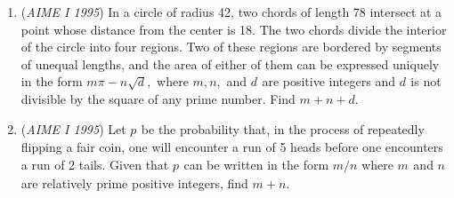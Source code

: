 \begin{enumerate}
	\item (\textit{AIME I 1995}) In a circle of radius 42, two chords of length 78 intersect at a point whose distance from the center is 18.  The two chords divide the interior of the circle into four regions.  Two of these regions are bordered by segments of unequal lengths, and the area of either of them can be expressed uniquely in the form $m\pi-n\sqrt{d},$ where $m, n,$ and $d_{}$ are positive integers and $d_{}$ is not divisible by the square of any prime number.  Find $m+n+d.$


	\item (\textit{AIME I 1995}) Let $p_{}$ be the probability that, in the process of repeatedly flipping a fair coin, one will encounter a run of 5 heads before one encounters a run of 2 tails.  Given that $p_{}$ can be written in the form $m/n$ where $m_{}$ and $n_{}$ are relatively prime positive integers, find $m+n$.


 

\end{enumerate}